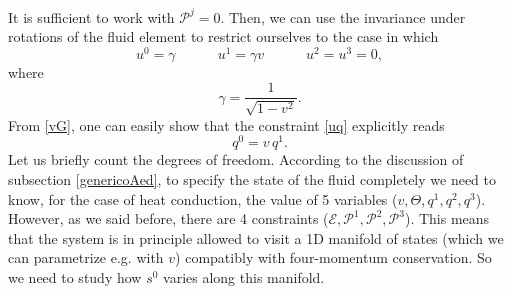 \documentclass[a4paper, amsfonts, amssymb, amsmath, reprint, showkeys, nofootinbib, twoside]{revtex4-1}
\newcommand{\spc}{\quad \quad \quad}
\begin{document}
It is sufficient to work with $\mathcal{P}^j =0$. Then, we can use the invariance under rotations of the fluid element to restrict ourselves to the case in which
\begin{equation}\label{vG}
u^0 = \gamma  \spc  u^1 =\gamma v  \spc u^2=u^3=0,
\end{equation}
where 
\begin{equation}
\gamma = \dfrac{1}{\sqrt{1-v^2}}.
\end{equation}
From \eqref{vG}, one can easily show that the constraint \eqref{uq} explicitly reads
\begin{equation}\label{q0}
q^0 = v \, q^1.
\end{equation}
Let us briefly count the degrees of freedom. According to the discussion of subsection \ref{genericoAed}, to specify the state of the fluid completely we need to know, for the case of heat conduction, the value of 5 variables ($v,\Theta,q^1,q^2,q^3$). However, as we said before, there are 4 constraints ($\mathcal{E},\mathcal{P}^1,\mathcal{P}^2,\mathcal{P}^3$). This means that the system is in principle allowed to visit a 1D manifold of states (which we can parametrize e.g. with $v$) compatibly with four-momentum conservation. So we need to study how $s^0$ varies along this manifold.
\end{document}
